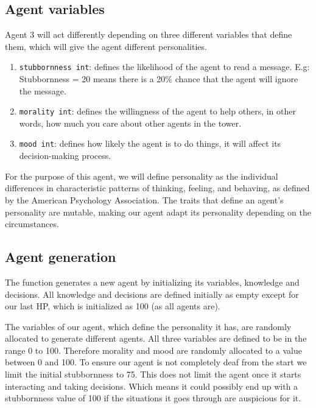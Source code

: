 \subsection{Agent variables}
Agent 3 will act differently depending on three different variables that define them, which will give the agent different personalities.
\begin{enumerate}
    \item \texttt{stubbornness int}: defines the likelihood of the agent to read a message. E.g: Stubbornness = 20 means there is a 20\% chance that the agent will ignore the message.
    \item \texttt{morality int}: defines  the willingness of the agent to help others, in other words, how much you care about other agents in the tower. 
    \item \texttt{mood int}: defines how likely the agent is to do things, it will affect its decision-making process.
\end{enumerate}
For the purpose of this agent, we will define personality as the individual differences in characteristic patterns of thinking, feeling, and behaving, as defined by the American Psychology Association. The traits that define an agent's personality are mutable, making our agent adapt its personality depending on the circumstances. 

\subsection{Agent generation}
The function generates a new agent by initializing its variables, knowledge and decisions. All knowledge and decisions are defined initially as empty except for our last HP, which is initialized as 100 (as all agents are). \par
The variables of our agent, which define the personality it has, are randomly allocated to generate different agents. All three variables are defined to be in the range 0 to 100. Therefore morality and mood are randomly allocated to a value between 0 and 100. To ensure our agent is not completely deaf from the start we limit the initial stubbornness to 75. This does not limit the agent once it starts interacting and taking decisions. Which means it could possibly end up with a stubbornness value of 100 if the situations it goes through are auspicious for it.

